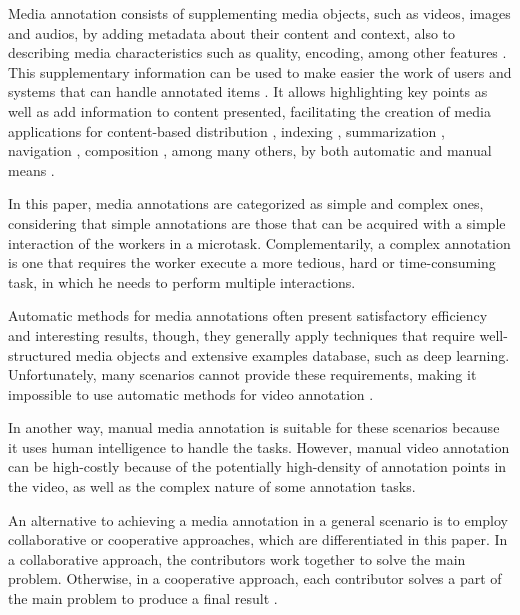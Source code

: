 Media annotation consists of supplementing media objects, such as videos, images and audios, by adding metadata about their content and context,  also to describing media characteristics such as quality, encoding, among other features \cite{Wang:2009:BDM:1652990.1653002}. This supplementary information can be used to make easier the work of users and systems that can handle annotated items \cite{172450}. It allows highlighting key points as well as add information to content presented\cite{Cunha:2015:MVA:2820426.2820449}, facilitating the creation of media applications for content-based distribution \cite{Zhang:2012:KIE:2339530.2339620}, indexing \cite{Zhang:2007:PRS:1290082.1290126}, summarization \cite{Fiao:2016:AGS:3001773.3001802}, navigation \cite{Goldman:2008}, composition \cite{Wilk:2015:VCC:2713168.2713178}, among many others, by both automatic and manual means \cite{Wang:2011:ALM:1899412.1899414,Mihalcea:2007:WLD:1321440.1321475}. 

In this paper, media annotations are categorized as simple and complex ones, considering that simple annotations are those that can be acquired with a simple interaction of the workers in a microtask. Complementarily, a complex annotation is one that requires the worker execute a more tedious, hard or time-consuming task, in which he needs to perform multiple interactions. 

Automatic methods for media annotations often present satisfactory efficiency and interesting results, though, they generally apply techniques that require well-structured media objects and extensive examples database, such as deep learning\cite{lecun2015deep}. Unfortunately, many scenarios cannot provide these requirements, making it impossible to use automatic methods for video annotation \cite{murthy2015automatic}. 

In another way, manual media annotation is suitable for these scenarios because it uses human intelligence to handle the tasks. However, manual video annotation can be high-costly because of the potentially high-density of annotation points in the video, as well as the complex nature of some annotation tasks. 

An alternative to achieving a media annotation in a general scenario is to employ collaborative or cooperative approaches, which are differentiated in this paper. In a collaborative approach, the contributors work together to solve the main problem. Otherwise, in a cooperative approach, each contributor solves a part of the main problem to produce a final result \cite{misanchuk2001building}.

